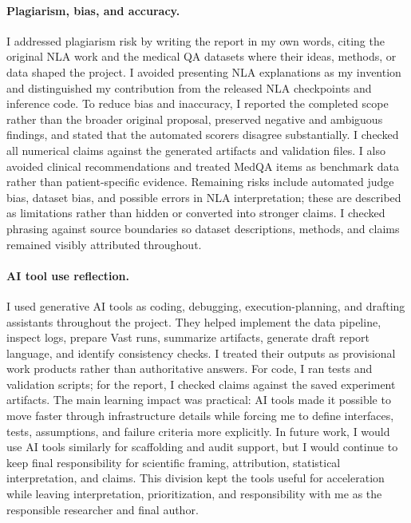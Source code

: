 \documentclass{article}
\begin{document}
\paragraph{Plagiarism, bias, and accuracy.}
I addressed plagiarism risk by writing the report in my own words, citing the original NLA work and the medical QA datasets where their ideas, methods, or data shaped the project. I avoided presenting NLA explanations as my invention and distinguished my contribution from the released NLA checkpoints and inference code. To reduce bias and inaccuracy, I reported the completed scope rather than the broader original proposal, preserved negative and ambiguous findings, and stated that the automated scorers disagree substantially. I checked all numerical claims against the generated artifacts and validation files. I also avoided clinical recommendations and treated MedQA items as benchmark data rather than patient-specific evidence. Remaining risks include automated judge bias, dataset bias, and possible errors in NLA interpretation; these are described as limitations rather than hidden or converted into stronger claims. I checked phrasing against source boundaries so dataset descriptions, methods, and claims remained visibly attributed throughout.

\paragraph{AI tool use reflection.}
I used generative AI tools as coding, debugging, execution-planning, and drafting assistants throughout the project. They helped implement the data pipeline, inspect logs, prepare Vast runs, summarize artifacts, generate draft report language, and identify consistency checks. I treated their outputs as provisional work products rather than authoritative answers. For code, I ran tests and validation scripts; for the report, I checked claims against the saved experiment artifacts. The main learning impact was practical: AI tools made it possible to move faster through infrastructure details while forcing me to define interfaces, tests, assumptions, and failure criteria more explicitly. In future work, I would use AI tools similarly for scaffolding and audit support, but I would continue to keep final responsibility for scientific framing, attribution, statistical interpretation, and claims. This division kept the tools useful for acceleration while leaving interpretation, prioritization, and responsibility with me as the responsible researcher and final author.
\end{document}
